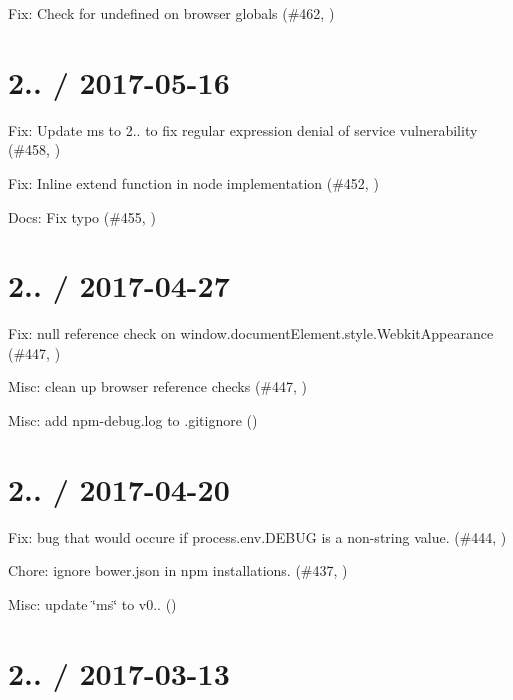 
\begin{DoxyItemize}
\item Fix\+: Check for undefined on browser globals (\#462, )
\end{DoxyItemize}

\section*{2.. / 2017-\/05-\/16 }


\begin{DoxyItemize}
\item Fix\+: Update ms to 2.. to fix regular expression denial of service vulnerability (\#458, )
\item Fix\+: Inline extend function in node implementation (\#452, )
\item Docs\+: Fix typo (\#455, )
\end{DoxyItemize}

\section*{2.. / 2017-\/04-\/27 }


\begin{DoxyItemize}
\item Fix\+: null reference check on window.\+document\+Element.\+style.\+Webkit\+Appearance (\#447, )
\item Misc\+: clean up browser reference checks (\#447, )
\item Misc\+: add npm-\/debug.\+log to .gitignore ()
\end{DoxyItemize}

\section*{2.. / 2017-\/04-\/20 }


\begin{DoxyItemize}
\item Fix\+: bug that would occure if process.\+env.\+D\+E\+B\+UG is a non-\/string value. (\#444, )
\item Chore\+: ignore bower.\+json in npm installations. (\#437, )
\item Misc\+: update \char`\"{}ms\char`\"{} to v0.. ()
\end{DoxyItemize}

\section*{2.. / 2017-\/03-\/13 }


